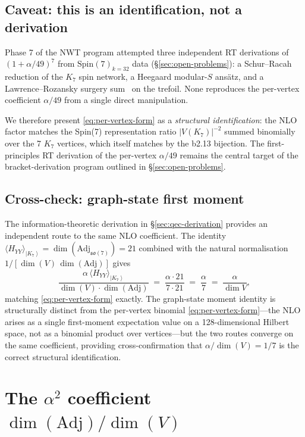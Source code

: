 \documentclass[11pt]{article}
\newcommand{\so}{\mathfrak{so}}
\newcommand{\Spin}{\mathrm{Spin}}
\newcommand{\Adj}{\mathrm{Adj}}
\newcommand{\ket}[1]{\left|#1\right\rangle}
\begin{document}
\subsection{Caveat: this is an identification, not a derivation}

Phase 7 of the NWT program attempted three independent RT
derivations of $(1 + \alpha/49)^7$ from $\Spin(7)_{k=32}$ data
(\S\ref{sec:open-problems}): a Schur--Racah reduction of the
$K_7$ spin network, a Heegaard modular-$S$ ans\"atz, and a
Lawrence--Rozansky surgery sum~\cite{lawrence-rozansky} on the
trefoil.  None reproduces
the per-vertex coefficient $\alpha/49$ from a single direct
manipulation.

We therefore present \eqref{eq:per-vertex-form} as a \emph{structural
identification}: the NLO factor matches the Spin(7) representation
ratio $|V(K_7)|^{-2}$ summed binomially over the 7 $K_7$ vertices,
which itself matches by the b2.13 bijection.  The first-principles
RT derivation of the per-vertex $\alpha/49$ remains the central
target of the bracket-derivation program outlined in
\S\ref{sec:open-problems}.

\subsection{Cross-check: graph-state first moment}
\label{sec:per-vertex-graph-state-cross}

The information-theoretic derivation in \S\ref{sec:qec-derivation}
provides an independent route to the same NLO coefficient.  The
identity $\langle H_{YY}\rangle_{\ket{K_7}} = \dim(\Adj_{\so(7)}) = 21$
combined with the natural normalisation
$1/[\dim(V)\,\dim(\Adj)]$ gives
\begin{equation}
  \frac{\alpha\,\langle H_{YY}\rangle_{\ket{K_7}}}
       {\dim(V)\cdot\dim(\Adj)}
  \;=\;
  \frac{\alpha \cdot 21}{7 \cdot 21}
  \;=\; \frac{\alpha}{7}
  \;=\; \frac{\alpha}{\dim V},
\end{equation}
matching \eqref{eq:per-vertex-form} exactly.  The graph-state moment
identity is structurally distinct from the per-vertex binomial
\eqref{eq:per-vertex-form}---the NLO arises as a single first-moment
expectation value on a 128-dimensional Hilbert space, not as a
binomial product over vertices---but the two routes converge on the
same coefficient, providing cross-confirmation that
$\alpha/\dim(V) = 1/7$ is the correct structural identification.

\section{The $\alpha^2$ coefficient $\dim(\Adj)/\dim(V)$}
\label{sec:alpha-squared}
\end{document}
